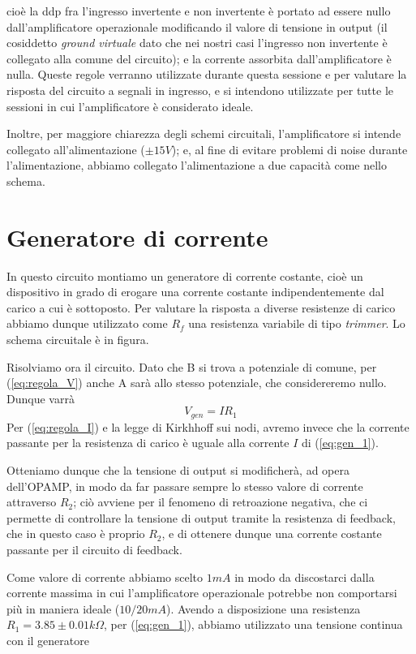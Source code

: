 \documentclass {article}
\begin{document}
cioè la ddp fra l'ingresso invertente e non invertente è portato ad essere nullo dall'amplificatore operazionale modificando il valore di tensione in output (il cosiddetto \textit{ground virtuale} dato che nei nostri casi l'ingresso non invertente è collegato alla comune del circuito); e la corrente assorbita dall'amplificatore è nulla.
Queste regole verranno utilizzate durante questa sessione e per valutare la risposta del circuito a segnali in ingresso, e si intendono utilizzate per tutte le sessioni in cui l'amplificatore è considerato ideale.

Inoltre, per maggiore chiarezza degli schemi circuitali, l'amplificatore si intende collegato all'alimentazione ($\pm 15 V$); e, al fine di evitare problemi di noise durante l'alimentazione, abbiamo collegato l'alimentazione a due capacità come nello schema.

\section{Generatore di corrente}

In questo circuito montiamo un generatore di corrente costante, cioè un dispositivo in grado di erogare una corrente costante indipendentemente dal carico a cui è sottoposto. Per valutare la risposta a diverse resistenze di carico abbiamo dunque utilizzato come $R_f$ una resistenza variabile di tipo \textit{trimmer}. Lo schema circuitale è in figura.

Risolviamo ora il circuito. Dato che B si trova a potenziale di comune, per (\ref{eq:regola_V}) anche A sarà allo stesso potenziale, che considereremo nullo. Dunque varrà
\begin{equation}
V_{gen}=I R_1
\label{eq:gen_1}
\end{equation}
Per (\ref{eq:regola_I}) e la legge di Kirkhhoff sui nodi, avremo invece che la corrente passante per la resistenza di carico è uguale alla corrente $I$ di (\ref{eq:gen_1}).

Otteniamo dunque che la tensione di output si modificherà, ad opera dell'OPAMP, in modo da far passare sempre lo stesso valore di corrente attraverso $R_2$; ciò avviene per il fenomeno di retroazione negativa, che ci permette di controllare la tensione di output tramite la resistenza di feedback, che in questo caso è proprio $R_2$, e di ottenere dunque una corrente costante passante per il circuito di feedback.

Come valore di corrente abbiamo scelto $1 mA$ in modo da discostarci dalla corrente massima in cui l'amplificatore operazionale potrebbe non comportarsi più in maniera ideale ($10/20 mA$). Avendo a disposizione una resistenza $R_1=3.85 \pm 0.01 k\Omega$, per (\ref{eq:gen_1}), abbiamo utilizzato una tensione continua con il generatore
\end{document}

